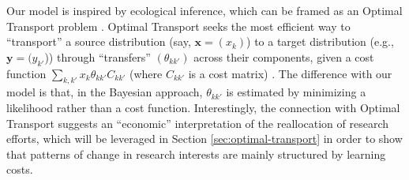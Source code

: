 \documentclass{article}
\begin{document}
Our model is inspired by ecological inference, which can be framed as an Optimal Transport problem \citep{muzellec2017tsallis,li2019learning}. Optimal Transport seeks the most efficient way to  ``transport'' a source distribution (say, $\bm{x}=(x_k)$) to a target distribution (e.g., $\bm{y}=(y_{k'}$)) through ``transfers'' $(\theta_{kk'})$ across their components, given a cost function $\sum_{k,k'} x_{k} \theta_{kk'}C_{kk'}$ (where $C_{kk'}$ is a cost matrix) \citep{Peyre2018}. The difference with our model is that, in the Bayesian approach, $\theta_{kk'}$ is estimated by minimizing a likelihood rather than a cost function. Interestingly, the connection with Optimal Transport suggests an ``economic'' interpretation of the reallocation of research efforts, which will be leveraged in Section \ref{sec:optimal-transport} in order to show that patterns of change in research interests are mainly structured by learning costs. %



\end{document}
